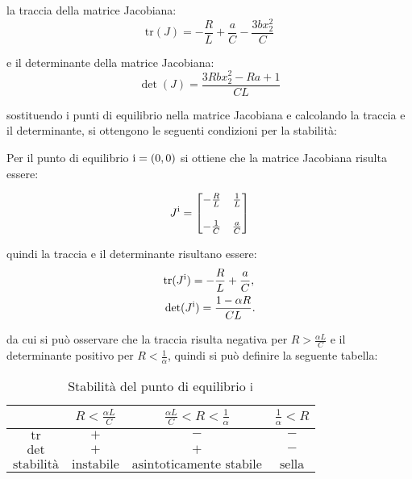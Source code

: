 \documentclass{article}
\newcommand{\rom}[1]{\uppercase\expandafter{\romannumeral #1\relax}}
\begin{document}
la traccia della matrice Jacobiana:
\[
    \text{tr}(J) = - \frac{R}{L} + \frac{a}{C} - \frac{3b x_2^2}{C}
\]

e il determinante della matrice Jacobiana:
\[
    \det(J) = \frac{3 R b x_2^2 - R a + 1}{C L}
\]

sostituendo i punti di equilibrio nella matrice Jacobiana e calcolando la traccia e il determinante, si ottengono le seguenti condizioni per la stabilità:

Per il punto di equilibrio \(\text{\rom{1}} = (0, 0)\) si ottiene che la matrice Jacobiana risulta essere:

\[
    J^\text{\rom{1}} =
    \begin{bmatrix}
        -\frac{R}{L} & \frac{1}{L} \\\\
        -\frac{1}{C} & \frac{a}{C}
    \end{bmatrix}
\]

quindi la traccia e il determinante risultano essere:
\begin{align*}
     & \text{tr}(J^\text{\rom{1}}) = -\frac{R}{L} + \frac{a}{C}, \\
     & \det(J^\text{\rom{1}})      = \frac{1 - \alpha R}{C L}.
\end{align*}

da cui si può osservare che la traccia risulta negativa per \(R > \frac{\alpha L}{C}\) e il determinante positivo per \(R < \frac{1}{\alpha}\), quindi si può definire la seguente tabella:

\begin{table}[h!]
    \centering
    \begin{tabular}{|c|c|c|c|}
        \hline
        $ $                & $R < \frac{\alpha L}{C}$ & $\frac{\alpha L}{C} < R < \frac{1}{\alpha}$ & $\frac{1}{\alpha} < R$ \\ \hline
        $\text{tr}$        & $+$                      & $-$                                         & $-$                    \\ \hline
        $\det$             & $+$                      & $+$                                         & $-$                    \\ \hline
        $\text{stabilità}$ & $\text{instabile}$       & $\text{asintoticamente stabile}$            & $\text{sella}$         \\ \hline
    \end{tabular}
    \caption{Stabilità del punto di equilibrio \(\text{\rom{1}}\)}
\end{table}
\end{document}

